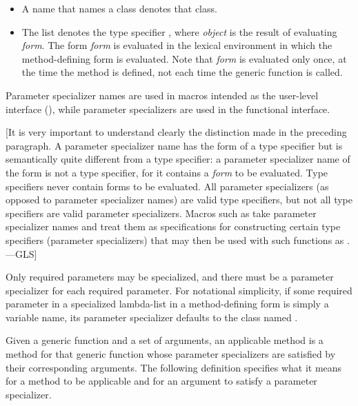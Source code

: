 \begin{itemize}
\item  A name that names a class denotes that class.

\item  The list  denotes the type specifier
, where {\it object\/} is the result of
evaluating {\it form\/}.  The form {\it form\/} is evaluated in the
lexical environment in which the method-defining form is
evaluated.  Note that {\it form\/} is evaluated only once, at the time
the method is defined, not each time the generic function is called.
\end{itemize}

Parameter specializer names are used in macros intended as the
user-level interface (), while parameter specializers
are used in the functional interface.

[It is very important to understand clearly the distinction made
in the preceding paragraph.  A parameter specializer name
has the form of a type specifier but is semantically quite different
from a type specifier: a parameter specializer name of the form
 is not a type specifier, for it contains
a {\it form\/} to be evaluated.   Type specifiers
never contain forms to be evaluated.  All parameter specializers
(as opposed to parameter specializer names) are valid type specifiers,
but not all type specifiers are valid parameter specializers.  Macros such as 
take parameter specializer names and treat them as specifications for
constructing certain type specifiers (parameter specializers) that may then be used
with such functions as .---GLS]


Only required parameters may be specialized, and there must be a
parameter specializer for each required parameter.  For notational
simplicity, if some required parameter in a specialized lambda-list in
a method-defining form is simply a variable name, its parameter
specializer defaults to the class named .

Given a generic function and a set of arguments, an {\bit applicable
method\/} is a method for that generic function whose parameter
specializers are satisfied by their corresponding arguments.  The
following definition specifies what it means for a method to be
applicable and for an argument to satisfy a parameter specializer.

